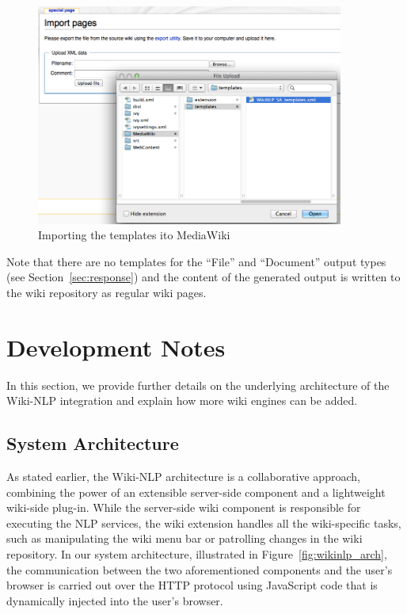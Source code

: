 \begin{figure}
\centering
\includegraphics[width=0.9\textwidth]{pictures/wiki_template_import.png}
\caption{Importing the \sa templates ito MediaWiki}
\label{fig:wiki_template_import}
\end{figure}

Note that there are no templates for the ``File'' and ``Document'' output types (see Section~\ref{sec:response}) and the content of the generated output is written to the wiki repository as regular wiki pages.

\section{Development Notes}
In this section, we provide further details on the underlying architecture of the Wiki-NLP integration and explain how more wiki engines can be added.

\subsection{System Architecture}
As stated earlier, the Wiki-NLP architecture is a collaborative approach, combining the power of an extensible server-side component and a lightweight wiki-side plug-in. While the server-side wiki component is responsible for executing the NLP services, the wiki extension handles all the wiki-specific tasks, such as manipulating the wiki menu bar or patrolling changes in the wiki repository. In our system architecture, illustrated in Figure~\ref{fig:wikinlp_arch}, the communication between the two aforementioned components and the user's browser is carried out over the HTTP protocol using JavaScript code that is dynamically injected into the user's browser.

